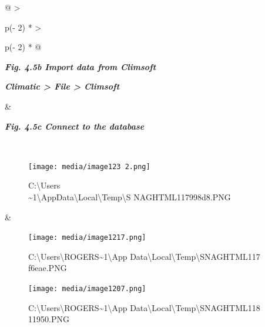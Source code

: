 \documentclass[
  letterpaper,
  DIV=11,
  numbers=noendperiod]{scrreprt}
\begin{document}
\begin{longtable}[]{@{}
  >{\raggedright\arraybackslash}p{(\columnwidth - 2\tabcolsep) * }
  >{\raggedright\arraybackslash}p{(\columnwidth - 2\tabcolsep) * }@{}}
\toprule\noalign{}
\begin{minipage}[b]{\linewidth}\raggedright
\textbf{\emph{Fig. 4.5b Import data from Climsoft}}

\textbf{\emph{Climatic \textgreater{} File \textgreater{} Climsoft}}
\end{minipage} & \begin{minipage}[b]{\linewidth}\raggedright
\textbf{\emph{Fig. 4.5c Connect to the database}}
\end{minipage} \\
\midrule\noalign{}
\endhead
\bottomrule\noalign{}
\endlastfoot
\begin{minipage}[t]{\linewidth}\raggedright
\begin{figure}[H]

{\centering \texttt{[image: media/image123 2.png]}

}

\caption{C:\textbackslash Users\\
\ROGERS\textasciitilde1\textbackslash AppData\textbackslash Local\textbackslash Temp\textbackslash S
NAGHTML117998d8.PNG}

\end{figure}%
\end{minipage} & \begin{minipage}[t]{\linewidth}\raggedright
\begin{figure}[H]

{\centering \texttt{[image: media/image1217.png]}

}

\caption{C:\textbackslash Users\textbackslash ROGERS\textasciitilde1\textbackslash App
Data\textbackslash Local\textbackslash Temp\textbackslash SNAGHTML117
f6eae.PNG}

\end{figure}%
\begin{figure}[H]

{\centering \texttt{[image: media/image1207.png]}

}

\caption{C:\textbackslash Users\textbackslash ROGERS\textasciitilde1\textbackslash App
Data\textbackslash Local\textbackslash Temp\textbackslash SNAGHTML118
11950.PNG}

\end{figure}%
\end{minipage} \\
\end{longtable}
\end{document}
